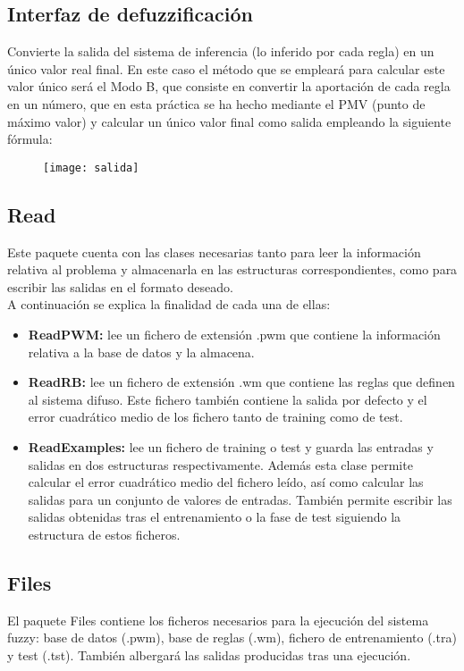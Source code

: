 \documentclass[12pt,a4paper]{article}
\begin{document}
\subsection{Interfaz de defuzzificación}
Convierte la salida del sistema de inferencia (lo inferido por cada regla) en un único valor real final. En este caso el método que se empleará para calcular este valor único será el Modo B, que consiste en convertir la aportación de cada regla en un número, que en esta práctica se ha hecho mediante el PMV (punto de máximo valor) y calcular un único valor final como salida empleando la siguiente fórmula: 
\begin{figure}[H]
\centering
\texttt{[image: salida]}
\label{flujoFS}
\end{figure}

\subsection{Read}
Este paquete cuenta con las clases necesarias tanto para leer la información relativa al problema y almacenarla en  las estructuras correspondientes, como para escribir las salidas en el formato deseado.\\
A continuación se explica la finalidad de cada una de ellas:
\begin{itemize}
\item \textbf{ReadPWM:} lee un fichero de extensión .pwm que contiene la información relativa a la base de datos y la almacena.
\item \textbf{ReadRB:} lee un fichero de extensión .wm  que contiene las reglas que definen al sistema difuso. Este fichero también contiene la salida por defecto y el error cuadrático medio de los fichero tanto de training como de test.
\item \textbf{ReadExamples:} lee un fichero de training o test y guarda las entradas y salidas en dos estructuras respectivamente. Además esta clase permite calcular el error cuadrático medio del fichero leído, así como calcular las salidas para un conjunto de valores de entradas. También permite escribir las salidas obtenidas tras el entrenamiento o la fase de test siguiendo la estructura de estos ficheros.
\end{itemize}

\subsection{Files}
El paquete Files contiene los ficheros necesarios para la ejecución del sistema fuzzy: base de datos (.pwm), base de reglas (.wm), fichero de entrenamiento (.tra) y test (.tst). También albergará las salidas producidas tras una ejecución.
\end{document}
